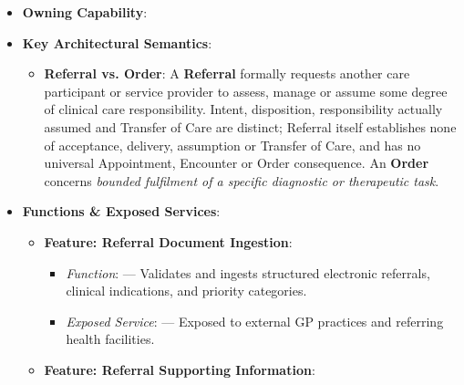 \begin{itemize}

\item 
\textbf{Owning Capability}: \texttt{}



\item 
\textbf{Key Architectural Semantics}:


\begin{itemize}

\item 
\textbf{Referral vs. Order}: A \textbf{Referral} formally requests another care participant or service provider to assess, manage or assume some degree of clinical care responsibility. Intent, disposition, responsibility actually assumed and Transfer of Care are distinct; Referral itself establishes none of acceptance, delivery, assumption or Transfer of Care, and has no universal Appointment, Encounter or Order consequence. An \textbf{Order} concerns \emph{bounded fulfilment of a specific diagnostic or therapeutic task}.



\end{itemize}


\item 
\textbf{Functions \& Exposed Services}:


\begin{itemize}

\item 
\textbf{Feature: Referral Document Ingestion}:


\begin{itemize}

\item 
\emph{Function}: \texttt{} — Validates and ingests structured electronic referrals, clinical indications, and priority categories.



\item 
\emph{Exposed Service}: \texttt{} — Exposed to external GP practices and referring health facilities.



\end{itemize}


\item 
\textbf{Feature: Referral Supporting Information}:


\begin{itemize}


\end{itemize}
\end{itemize}
\end{itemize}

